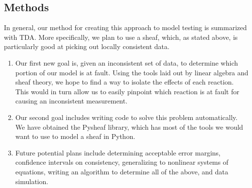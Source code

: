 \documentclass[12pt]{article}
\begin{document}
\subsection{Methods}
In general, our method for creating this approach to model testing is summarized with TDA. More specifically, we plan to use a sheaf, which, as stated above, is particularly good at picking out locally consistent data. 
\begin{enumerate}
	\item Our first new goal is, given an inconsistent set of data, to determine which portion of our model is at fault. Using the tools laid out by linear algebra and sheaf theory, we hope to find a way to isolate the effects of each reaction. This would in turn allow us to easily pinpoint which reaction is at fault for causing an inconsistent measurement.
	
	\item  Our second goal includes writing code to solve this problem automatically. We have obtained the Pysheaf library, which has most of the tools we would want to use to model a sheaf in Python. 
	
	\item Future potential plans include determining acceptable error margins, confidence intervals on consistency, generalizing to nonlinear systems of equations, writing an algorithm to determine all of the above, and data simulation.
\end{enumerate}
\end{document}
